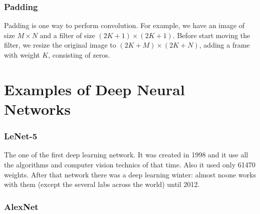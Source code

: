 \subsubsection*{Padding}

Padding is one way to perform convolution. For example, we have an image of size $M\times N$ and a filter of size $(2K+1)\times(2K+1)$. Before start moving the filter, we resize the original image to $(2K+M)\times(2K+N)$, adding a frame with weight $K$, consisting of zeros.

\section{Examples of Deep Neural Networks}
\vspace{-0.6cm}
\subsubsection*{LeNet-5}

The one of the first deep learning network. It was created in 1998 and it use all the algorithms and computer vision technics of that time. Also it used only 61470 weights. After that network there was a deep learning winter: almost noone works with them (except the several labs across the world) until 2012.

\subsubsection*{AlexNet}


